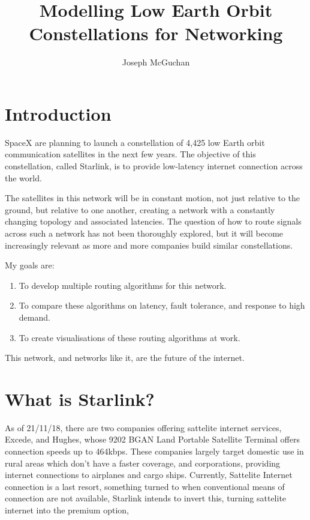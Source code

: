 \documentclass[12pt]{article}
\begin{document}
\title{Modelling Low Earth Orbit Constellations for Networking}
\author{Joseph McGuchan}
\maketitle
\thispagestyle{empty}

\section{Introduction}

SpaceX are planning to launch a constellation of 4,425 low Earth orbit communication satellites in the next few years. The objective of this constellation, called Starlink, is to provide low-latency internet connection across the world.

The satellites in this network will be in constant motion, not just relative to the ground, but relative to one another, creating a network with a constantly changing topology and associated latencies. The question of how to route signals across such a network has not been thoroughly explored, but it will become increasingly relevant as more and more companies build similar constellations.

My goals are:
\begin{enumerate}
	\item To develop multiple routing algorithms for this network.
	\item To compare these algorithms on latency, fault tolerance, and response to high demand.
	\item To create visualisations of these routing algorithms at work.
\end{enumerate}

This network, and networks like it, are the future of the internet.


\section{What is Starlink?}


As of 21/11/18, there are two companies offering sattelite internet services, Excede\cite{ExcedeWebsite}, and Hughes, whose 9202 BGAN Land Portable Satellite Terminal offers connection speeds up to 464kbps\cite{HughesWebsite}. These companies largely target domestic use in rural areas which don’t have a faster coverage, and corporations, providing internet connections to airplanes and cargo ships. Currently, Sattelite Internet connection is a last resort, something turned to when conventional means of connection are not available, Starlink intends to invert this, turning sattelite internet into the premium option, 
\end{document}
